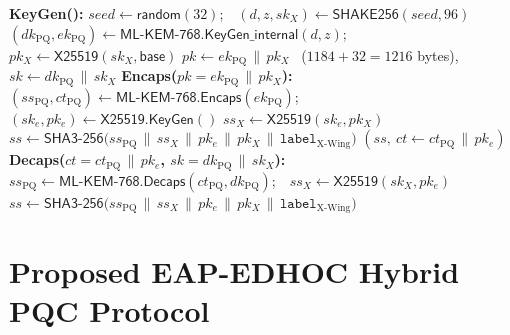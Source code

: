 \documentclass[symmetry,article,submit,moreauthors]{Definitions/mdpi}
\newcommand{\Xtwofive}{\mathsf{X25519}}
\begin{document}
\begin{algorithm}[H]
\caption{X-Wing hybrid KEM: $\mathsf{KeyGen}()$, $\mathsf{Encaps}(pk)$, and $\mathsf{Decaps}(ct, sk)$}
\label{alg:xwing}
\label{alg:xwing-keygen}\label{alg:xwing-encaps}\label{alg:xwing-decaps}
{\footnotesize
\begin{algorithmic}[1]
\State \textbf{KeyGen():}
\State \hspace{1em}$seed \gets \mathsf{random}(32)$;\ \ $(d, z, sk_{X}) \gets \mathsf{SHAKE256}(seed, 96)$
\State \hspace{1em}$(dk_{\mathrm{PQ}}, ek_{\mathrm{PQ}}) \gets \mathsf{ML\text{-}KEM\text{-}768.KeyGen\_internal}(d, z)$;\ \ $pk_{X} \gets \Xtwofive(sk_{X}, \mathsf{base})$
\State \hspace{1em}\Return $pk \gets ek_{\mathrm{PQ}} \,\|\, pk_{X}$ \ ($1184 + 32 = 1216$ bytes),\ \ $sk \gets dk_{\mathrm{PQ}} \,\|\, sk_{X}$
\State \textbf{Encaps($pk = ek_{\mathrm{PQ}} \,\|\, pk_{X}$):}
\State \hspace{1em}$(ss_{\mathrm{PQ}}, ct_{\mathrm{PQ}}) \gets \mathsf{ML\text{-}KEM\text{-}768.Encaps}(ek_{\mathrm{PQ}})$;\ \ $(sk_{e}, pk_{e}) \gets \Xtwofive.\mathsf{KeyGen}()$
\State \hspace{1em}$ss_{X} \gets \Xtwofive(sk_{e}, pk_{X})$
\State \hspace{1em}$ss \gets \mathsf{SHA3\text{-}256}\big(ss_{\mathrm{PQ}} \,\|\, ss_{X} \,\|\, pk_{e} \,\|\, pk_{X} \,\|\, \texttt{label}_{\text{X-Wing}}\big)$ 
\State \hspace{1em}\Return $(ss,\ ct \gets ct_{\mathrm{PQ}} \,\|\, pk_{e})$
\State \textbf{Decaps($ct = ct_{\mathrm{PQ}} \,\|\, pk_{e}$, $sk = dk_{\mathrm{PQ}} \,\|\, sk_{X}$):}
\State \hspace{1em}$ss_{\mathrm{PQ}} \gets \mathsf{ML\text{-}KEM\text{-}768.Decaps}(ct_{\mathrm{PQ}}, dk_{\mathrm{PQ}})$;\ \ $ss_{X} \gets \Xtwofive(sk_{X}, pk_{e})$
\State \hspace{1em}\Return $ss \gets \mathsf{SHA3\text{-}256}\big(ss_{\mathrm{PQ}} \,\|\, ss_{X} \,\|\, pk_{e} \,\|\, pk_{X} \,\|\, \texttt{label}_{\text{X-Wing}}\big)$
\end{algorithmic}
}
\end{algorithm}

\section{Proposed EAP-EDHOC Hybrid PQC Protocol}
\label{sec:eapedhocPQC}
\end{document}
